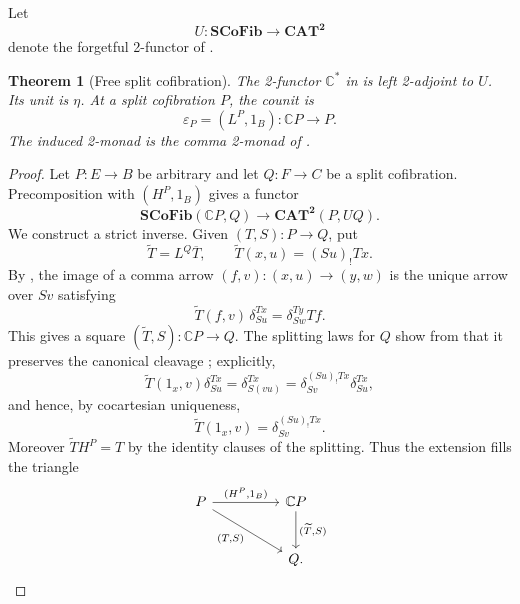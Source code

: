 \documentclass[11pt]{article}
\theoremstyle{plain}
\newtheorem{theorem}{Theorem}[section]
\theoremstyle{definition}
\theoremstyle{remark}
\newcommand{\CAT}{\mathbf{CAT}}
\newcommand{\SCoFib}{\mathbf{SCoFib}}
\newcommand{\C}{\mathbb{C}}
\numberwithin{equation}{section}
\begin{document}
Let
\begin{equation*}
U\colon\SCoFib\longrightarrow\CAT^{\mathbf 2}
\end{equation*}
denote the forgetful 2-functor of .

\begin{theorem}[Free split cofibration]\label{thm:free-adjunction}
The 2-functor $\C^{\!*}$ in  is left
2-adjoint to $U$.  Its unit is $\eta$.  At a split cofibration $P$,
the counit is
\begin{equation}
\varepsilon_P=(L^{P},1_B)\colon\C P\longrightarrow P.
  \label{eq:counit}
\end{equation}
The induced 2-monad is the comma 2-monad of
.
\end{theorem}

\begin{proof}
Let $P\colon E\to B$ be arbitrary and let $Q\colon F\to C$ be a
split cofibration.  Precomposition with $(H^{P},1_B)$ gives a functor
\begin{equation}
\SCoFib(\C P,Q)\longrightarrow
  \CAT^{\mathbf 2}(P,UQ).
  \label{eq:hom-map}
\end{equation}
We construct a strict inverse.  Given
$(T,S)\colon P\to Q$, put
\begin{equation}
\widetilde T=L^{Q}\overline T,
  \qquad
  \widetilde T(x,u)=(Su)_{!}Tx.
  \label{eq:T-tilde}
\end{equation}
By , the image of a comma arrow
$(f,v)\colon(x,u)\to(y,w)$ is the unique arrow over $Sv$ satisfying
\begin{equation}
\widetilde T(f,v)\,\delta^{Tx}_{Su}
  =\delta^{Ty}_{Sw}Tf.
  \label{eq:T-tilde-arrow}
\end{equation}
This gives a square $(\widetilde T,S)\colon\C P\to Q$.
The splitting laws for $Q$ show from  that it
preserves the canonical cleavage ; explicitly,
\begin{equation*}
\widetilde T(1_x,v)\delta^{Tx}_{Su}
  =\delta^{Tx}_{S(vu)}
  =\delta^{(Su)_{!}Tx}_{Sv}\delta^{Tx}_{Su},
\end{equation*}
and hence, by cocartesian uniqueness,
\begin{equation*}
\widetilde T(1_x,v)=\delta^{(Su)_{!}Tx}_{Sv}.
\end{equation*}
Moreover $\widetilde T H^{P}=T$ by the identity clauses of the
splitting.
Thus the extension fills the triangle
\begin{equation*}
\begin{tikzcd}[column sep=huge,row sep=large]
P \arrow[r,"{(H^P,1_B)}"]
  \arrow[dr,"{(T,S)}"']
& \C P \arrow[d,"{(\widetilde T,S)}"] \\
& Q .
\end{tikzcd}
\end{equation*}


\end{proof}
\end{document}
